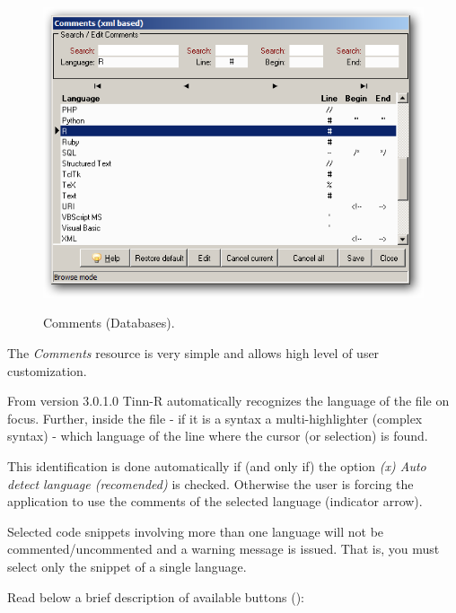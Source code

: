 \begin{figure}[h!]
  \includegraphics[scale=0.35]{./res/comments_dlg.png}\\
  \caption{Comments (Databases).}
  \label{fig:comments_dlg}
\end{figure}

The \textit{Comments} resource is very simple and allows high level
of user customization.

From version 3.0.1.0 Tinn-R automatically recognizes the
language of the file on focus. Further, inside the file
- if it is a syntax a multi-highlighter (complex syntax) - which language of
the line where the cursor (or selection) is found.

This identification is done automatically if (and only if) the option
\textit{(x) Auto detect language (recomended)} is checked. Otherwise
the user is forcing the application to use the comments of the selected language
(indicator arrow).

Selected code snippets involving more than one language will not be commented/uncommented
and a warning message is issued. That is, you must select only the snippet of a single language.

Read below a brief description of available buttons ():

